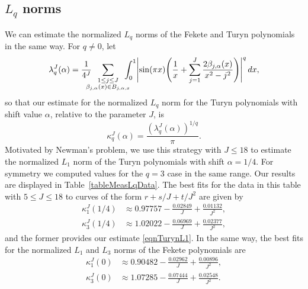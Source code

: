 \documentclass[reqno]{amsart}
\numberwithin{equation}{section}
\numberwithin{table}{section}
\numberwithin{figure}{section}
\begin{document}
\subsection{$L_q$ norms}\label{subsecLq}

We can estimate the normalized $L_q$ norms of the Fekete and Turyn polynomials in the same way.
For $q\neq0$, let
\[
\lambda_q^J(\alpha) = \frac{1}{4^J} \hspace{-2ex} \sum_{\substack{1\leq j\leq J\\\beta_{j,\alpha}(x)\in B_{j,\alpha,x}}} \hspace{-2ex} \int_0^1 \Biggl\lvert \sin(\pi x) \Biggl(\frac{1}{x} + \sum_{j=1}^J \frac{2\beta_{j,\alpha}(x)}{x^2-j^2}\Biggr) \Biggr\rvert^q \, dx,
\]
so that our estimate for the normalized $L_q$ norm for the Turyn polynomials with shift value $\alpha$, relative to the parameter $J$, is
\[
\kappa_q^J(\alpha) = \frac{\left(\lambda_q^J(\alpha)\right)^{1/q}}{\pi}.
\]
Motivated by Newman's problem, we use this strategy with $J\leq18$ to estimate the normalized $L_1$ norm of the Turyn polynomials with shift $\alpha=1/4$.
For symmetry we computed values for the $q=3$ case in the same range.
Our results are displayed in Table~\ref{tableMeasLqData}.
The best fits for the data in this table with $5\leq J\leq18$ to curves of the form $r+s/J+t/J^2$ are given by
\begin{equation*}\label{eqnFitTurL1L3}
\begin{split}
\kappa_1^J(1/4) &\approx 0.97757 - \frac{0.02849}{J} + \frac{0.01132}{J^2},\\
\kappa_3^J(1/4) &\approx 1.02022 - \frac{0.06969}{J} + \frac{0.02377}{J^2},
\end{split}
\end{equation*}
and the former provides our estimate \eqref{eqnTurynL1}.
In the same way, the best fits for the normalized $L_1$ and $L_3$ norms of the Fekete polynomials are
\begin{equation*}\label{eqnFitFekL1L3}
\begin{split}
\kappa_1^J(0) &\approx 0.90482 - \frac{0.02962}{J} + \frac{0.00896}{J^2},\\
\kappa_3^J(0) &\approx 1.07285 - \frac{0.07444}{J} + \frac{0.02548}{J^2}.
\end{split}
\end{equation*}
\end{document}
